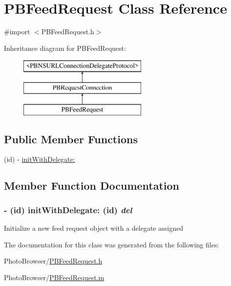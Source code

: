 \hypertarget{interface_p_b_feed_request}{
\section{PBFeedRequest Class Reference}
\label{interface_p_b_feed_request}
}


{\ttfamily \#import $<$PBFeedRequest.h$>$}

Inheritance diagram for PBFeedRequest:\begin{figure}[H]
\begin{center}
\leavevmode
\includegraphics[height=3cm]{interface_p_b_feed_request}
\end{center}
\end{figure}
\subsection*{Public Member Functions}
\begin{DoxyCompactItemize}
\item 
(id) -\/ \hyperlink{interface_p_b_feed_request_a532e8e434cfa987bbdfed75a19185b65}{initWithDelegate:}
\end{DoxyCompactItemize}


\subsection{Member Function Documentation}
\hypertarget{interface_p_b_feed_request_a532e8e434cfa987bbdfed75a19185b65}{
\subsubsection[{initWithDelegate:}]{\setlength{\rightskip}{0pt plus 5cm}-\/ (id) initWithDelegate: (id) {\em del}}}
\label{interface_p_b_feed_request_a532e8e434cfa987bbdfed75a19185b65}
Initialize a new feed request object with a delegate assigned 

The documentation for this class was generated from the following files:\begin{DoxyCompactItemize}
\item 
PhotoBrowser/\hyperlink{_p_b_feed_request_8h}{PBFeedRequest.h}\item 
PhotoBrowser/\hyperlink{_p_b_feed_request_8m}{PBFeedRequest.m}\end{DoxyCompactItemize}
